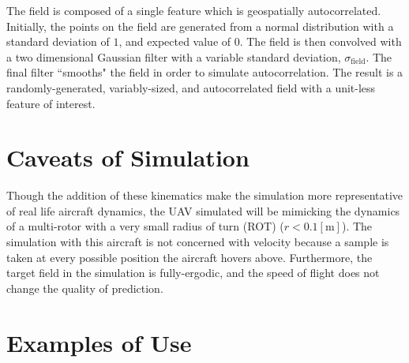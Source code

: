 The field is composed of a single feature which is geospatially autocorrelated. Initially, the points on the field are generated from a normal distribution with a standard deviation of $1$, and expected value of $0$. The field is then convolved with a two dimensional Gaussian filter with a variable standard deviation, $\sigma_{\text{field}}$. The final filter ``smooths" the field in order to simulate autocorrelation. The result is a randomly-generated, variably-sized, and autocorrelated field with a unit-less feature of interest.

\section{Caveats of Simulation}
Though the addition of these kinematics make the simulation more representative of real life aircraft dynamics, the UAV simulated will be mimicking the dynamics of a multi-rotor with a very small radius of turn (ROT) ($r < 0.1 [\text{m}]$). The simulation with this aircraft is not concerned with velocity because a sample is taken at every possible position the aircraft hovers above. Furthermore, the target field in the simulation is fully-ergodic, and the speed of flight does not change the quality of prediction.

\section{Examples of Use}
